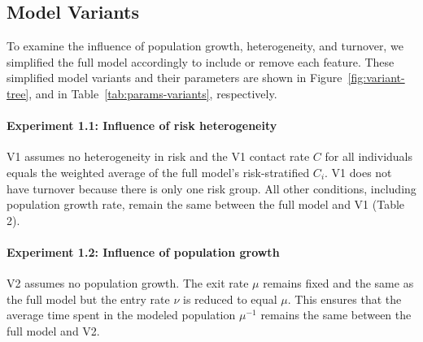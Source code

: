 \subsection{Model Variants}\label{ss:exp-variants}
To examine the influence of population growth, heterogeneity, and turnover,
we simplified the full model accordingly to include or remove each feature. 
These simplified model variants and their parameters are shown in Figure~\ref{fig:variant-tree},
and in Table~\ref{tab:params-variants}, respectively.
\paragraph{Experiment 1.1: Influence of risk heterogeneity}\label{p:exp-1-hetero}
V1 assumes no heterogeneity in risk and 
the V1 contact rate $C$ for all individuals equals the weighted 
average of the full model's risk-stratified $C_i$.						%
V1 does not have turnover because there is only one risk group.
All other conditions, including population growth rate, remain the same between
the full model and V1 (Table 2).

\paragraph{Experiment 1.2: Influence of population growth}\label{p:exp-1-growth}
V2 assumes no population growth. The exit rate $\mu$ remains fixed and the same as the full model
but the entry rate $\nu$ is reduced to equal $\mu$.
This ensures that the average time spent in the modeled population $\mu^{-1}$ remains the same between the full model and V2. %

